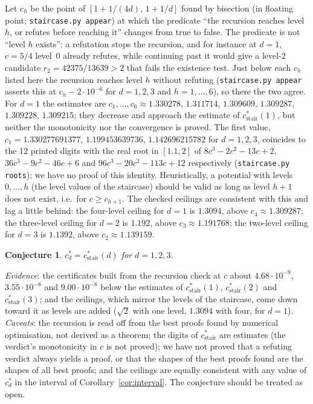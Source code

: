 \documentclass[11pt]{article}
\newtheorem{conjecture}[theorem]{Conjecture}
\theoremstyle{definition}
\newcommand{\cstair}{c^{*}_{\mathrm{stair}}}
\begin{document}
Let $c_h$ be the point of $[1+1/(4d),\,1+1/d]$ found by bisection (in floating point; \texttt{staircase.py appear}) at which the predicate ``the recursion reaches level $h$, or refutes before reaching it'' changes from true to false. The predicate is not ``level $h$ exists'': a refutation stops the recursion, and for instance at $d=1$, $c=5/4$ level~0 already refutes, while continuing past it would give a level-2 candidate $r_2=42375/13639>2$ that fails the existence test. Just below each $c_h$ listed here the recursion reaches level $h$ without refuting (\texttt{staircase.py appear} asserts this at $c_h-2\cdot10^{-6}$ for $d=1,2,3$ and $h=1,\dots,6$), so there the two agree. For $d=1$ the estimates are $c_1,\dots,c_6\approx1.330278$, $1.311714$, $1.309609$, $1.309287$, $1.309228$, $1.309215$; they decrease and approach the estimate of $\cstair(1)$, but neither the monotonicity nor the convergence is proved. The first value, $c_1=1.330277691377$, $1.199453639736$, $1.142696215782$ for $d=1,2,3$, coincides to the 12 printed digits with the real root in $[1.1,2]$ of $8c^3-2c^2-13c+2$, $36c^3-9c^2-46c+6$ and $96c^3-20c^2-113c+12$ respectively (\texttt{staircase.py roots}); we have no proof of this identity. Heuristically, a potential with levels $0,\dots,h$ (the level values of the staircase) should be valid as long as level $h+1$ does not exist, i.e.\ for $c\ge c_{h+1}$. The checked ceilings are consistent with this and lag a little behind: the four-level ceiling for $d=1$ is $1.3094$, above $c_4\approx1.309287$; the three-level ceiling for $d=2$ is $1.192$, above $c_3\approx1.191768$; the two-level ceiling for $d=3$ is $1.1392$, above $c_2\approx1.139159$.

\begin{conjecture}\label{conj}
$c^*_d=\cstair(d)$ for $d=1,2,3$.
\end{conjecture}
\emph{Evidence}: the certificates built from the recursion check at $c$ about $4.68\cdot10^{-9}$, $3.55\cdot10^{-8}$ and $9.00\cdot10^{-8}$ below the estimates of $\cstair(1)$, $\cstair(2)$ and $\cstair(3)$; and the ceilings, which mirror the levels of the staircase, come down toward it as levels are added ($\sqrt2$ with one level, $1.3094$ with four, for $d=1$). \emph{Caveats}: the recursion is read off from the best proofs found by numerical optimisation, not derived as a theorem; the digits of $\cstair$ are estimates (the verdict's monotonicity in $c$ is not proved); we have not proved that a refuting verdict always yields a proof, or that the shapes of the best proofs found are the shapes of all best proofs; and the ceilings are equally consistent with any value of $c^*_d$ in the interval of Corollary~\ref{cor:interval}. The conjecture should be treated as open.
\end{document}

